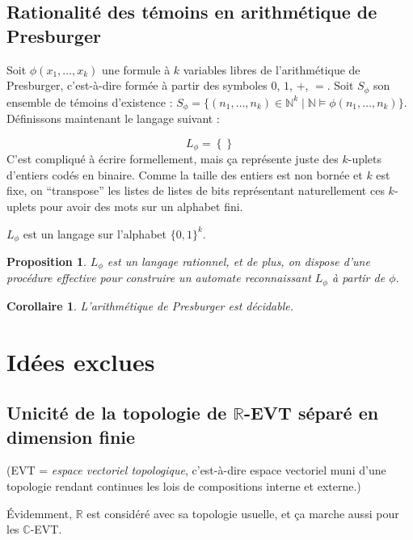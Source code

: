 \documentclass[a4paper, 11pt]{article}
\def\N{\mathbb{N}}
\def\R{\mathbb{R}}
\def\C{\mathbb{C}}
\newtheorem*{proposition}{Proposition}
\newtheorem*{corollary}{Corollaire}
\begin{document}
\subsection{Rationalité des témoins en arithmétique de Presburger}

Soit $\phi(x_1,\ldots,x_k)$ une formule à $k$ variables libres de l'arithmétique
de Presburger, c'est-à-dire formée à partir des symboles $0$, $1$, $+$, $=$.
Soit $S_\phi$ son ensemble de témoins d'existence : $S_\phi = \{ (n_1, \ldots,
n_k) \in \N^k \mid \N \models \phi(n_1, \ldots, n_k) \}$. Définissons maintenant
le langage suivant :

\[ L_\phi = \left\{  \right\}\]
C'est compliqué à écrire formellement, mais ça représente juste des $k$-uplets
d'entiers codés en binaire. Comme la taille des entiers est non bornée et $k$
est fixe, on \enquote{transpose} les listes de listes de bits représentant
naturellement ces $k$-uplets pour avoir des mots sur un alphabet fini.

$L_\phi$ est un langage sur l'alphabet $\{0,1\}^k$.

\begin{proposition}
  $L_\phi$ est un langage rationnel, et de plus, on dispose d'une procédure
  effective pour construire un automate reconnaissant $L_\phi$ à partir de
  $\phi$.
\end{proposition}

\begin{corollary}
  L'arithmétique de Presburger est décidable.
\end{corollary}

\subsection{}



\section{Idées exclues}

\subsection{Unicité de la topologie de $\R$-EVT séparé en dimension finie}

(EVT = \emph{espace vectoriel topologique}, c'est-à-dire espace vectoriel muni
d'une topologie rendant continues les lois de compositions interne et externe.)

Évidemment, $\R$ est considéré avec sa topologie usuelle, et ça marche aussi
pour les $\C$-EVT.
\end{document}
